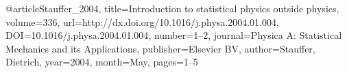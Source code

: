 @article{Stauffer_2004, title={Introduction to statistical physics outside physics}, volume={336}, url={http://dx.doi.org/10.1016/j.physa.2004.01.004}, DOI={10.1016/j.physa.2004.01.004}, number={1–2}, journal={Physica A: Statistical Mechanics and its Applications}, publisher={Elsevier BV}, author={Stauffer, Dietrich}, year={2004}, month={May}, pages={1–5}}